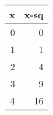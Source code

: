 \begin{tabular}{rr}
\toprule
 x &  x-sq \\
\midrule
 0 &     0 \\
 1 &     1 \\
 2 &     4 \\
 3 &     9 \\
 4 &    16 \\
\bottomrule
\end{tabular}
